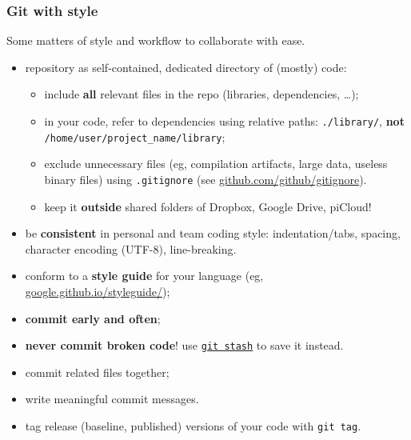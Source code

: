 \documentclass[10pt,svgnames,handout]{beamer}
\begin{document}
\begin{frame}
\label{style}
\frametitle{Git with style}

Some matters of style and workflow to collaborate with ease.

\begin{itemize}[<+->]
\item repository as self-contained, dedicated directory of (mostly) code:
\begin{itemize}
  \item include \textbf{all} relevant files in the repo (libraries, dependencies, \ldots);
  \item in your code, refer to dependencies using relative paths: \lstinline{./library/}, \textbf{not} \lstinline{/home/user/project_name/library};
  \item exclude unnecessary files (eg, compilation artifacts, large data, useless binary files) using \texttt{.gitignore} (see \href{https://github.com/github/gitignore}{github.com/github/gitignore}).
  \item keep it \textbf{outside} shared folders of Dropbox, Google Drive, piCloud!
\end{itemize}
\item be \textbf{consistent} in personal and team coding style: indentation/tabs, spacing, character encoding (UTF-8), line-breaking.
\item conform to a \textbf{style guide} for your language (eg, \href{https://google.github.io/styleguide/}{google.github.io/styleguide/});
\item \textbf{commit early and often};
\item \textbf{never commit broken code}! use \href{https://git-scm.com/book/it/v2/Git-Tools-Stashing-and-Cleaning}{\lstinline{git stash}} to save it instead.
\item commit related files together;
\item write meaningful commit messages.
\item tag release (baseline, published) versions of your code with \lstinline{git tag}.
\end{itemize}

\end{frame}
\end{document}
